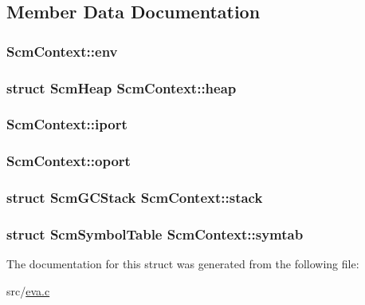 \subsection{Member Data Documentation}
\hypertarget{struct_scm_context_a464453bdb8b974f5e38649d7a0664104}{
\subsubsection[{env}]{ Scm\-Context\-::env}}\label{struct_scm_context_a464453bdb8b974f5e38649d7a0664104}
\hypertarget{struct_scm_context_ab8423487a2570390b3b6c4b724c38864}{
\subsubsection[{heap}]{\setlength{\rightskip}{0pt plus 5cm}struct {\bf Scm\-Heap} Scm\-Context\-::heap}}\label{struct_scm_context_ab8423487a2570390b3b6c4b724c38864}
\hypertarget{struct_scm_context_a8542de6050cbcf95df9677c6287d8646}{
\subsubsection[{iport}]{ Scm\-Context\-::iport}}\label{struct_scm_context_a8542de6050cbcf95df9677c6287d8646}
\hypertarget{struct_scm_context_a1087d86b13a525aa7424c3874935c305}{
\subsubsection[{oport}]{ Scm\-Context\-::oport}}\label{struct_scm_context_a1087d86b13a525aa7424c3874935c305}
\hypertarget{struct_scm_context_af136918a5f570af01f504f3a858378df}{
\subsubsection[{stack}]{\setlength{\rightskip}{0pt plus 5cm}struct {\bf Scm\-G\-C\-Stack} Scm\-Context\-::stack}}\label{struct_scm_context_af136918a5f570af01f504f3a858378df}
\hypertarget{struct_scm_context_a2baaf5bd61ffa1bd8e395bafa9ccd086}{
\subsubsection[{symtab}]{\setlength{\rightskip}{0pt plus 5cm}struct {\bf Scm\-Symbol\-Table} Scm\-Context\-::symtab}}\label{struct_scm_context_a2baaf5bd61ffa1bd8e395bafa9ccd086}


The documentation for this struct was generated from the following file\-:\begin{DoxyCompactItemize}
\item 
src/\hyperlink{eva_8c}{eva.\-c}\end{DoxyCompactItemize}
